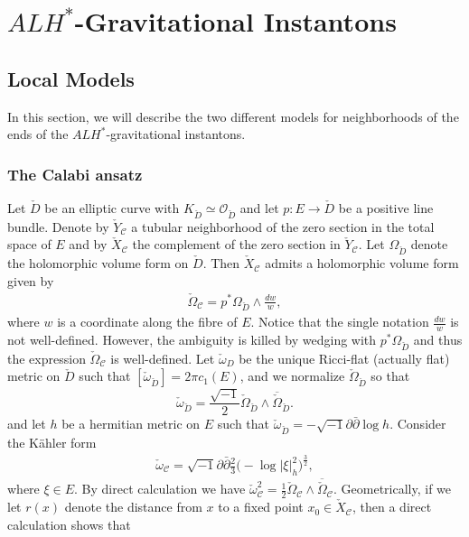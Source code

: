 \documentclass[11pt]{amsart}
\theoremstyle{plain}
\theoremstyle{definition}
\numberwithin{equation}{section}
\begin{document}
\section{$ALH^*$-Gravitational Instantons}   \label{sec: ALH}
\subsection{Local Models} In this section, we will describe the two different models for   neighborhoods of the ends of the $ALH^*$-gravitational instantons. 
 \subsubsection{The Calabi ansatz} \label{sec: Calabi ansatz}
Let $\check{D}$ be an elliptic curve with $K_{\check{D}} \simeq \mathcal{O}_{\check{D}}$ and let $p: E\rightarrow \check{D}$ be a positive line bundle. Denote by $\check{Y}_{\mathcal{C}}$ a tubular neighborhood of the zero section in the total space of $E$ and by $\check{X}_{\mathcal{C}}$ the complement of the zero section in $\check{Y}_{\mathcal{C}}$. Let $\Omega_{\check{D}}$ denote the holomorphic volume form on $\check{D}$. Then $\check{X}_{\mathcal{C}}$ admits a holomorphic volume form given by
\begin{align*}
	\check{\Omega}_{\mathcal{C}}=p^*\Omega_{\check{D}}\wedge \frac{dw}{w},
\end{align*} 
where $w$ is a coordinate along the fibre of $E$. Notice that the single notation $\frac{dw}{w}$ is not well-defined. However, the ambiguity is killed by wedging with $p^*\Omega_{\check{D}}$ and thus the expression $\check{\Omega}_{\mathcal{C}}$ is well-defined. Let $\check{\omega}_D$ be the unique Ricci-flat (actually flat) metric on $\check{D}$ such that $[\check{\omega}_{\check{D}}]=2\pi c_1(E)$, and we normalize $\check{\Omega}_{\check{D}}$ so that
\[
\check{\omega}_{\check{D}} = \frac{\sqrt{-1}}{2}\check{\Omega}_{\check{D}}\wedge \overline{\check{\Omega}}_{\check{D}}.
\]
and let $h$ be a hermitian metric on $E$ such that $\check{\omega}_{\check{D}}=-\sqrt{-1}\partial \bar{\partial}\log h$. Consider the K\"ahler form
\begin{align*}
	\check{\omega}_{\mathcal{C}}=\sqrt{-1}\partial \bar{\partial}\frac{2}{3}\big(-\log{|\xi|^2_h}\big)^{\frac{3}{2}},
\end{align*} 
where $\xi \in E$.  By direct calculation we have
$
\check{\omega}_{\mathcal{C}}^2 = \frac{1}{2} \check{\Omega}_{\mathcal{C}} \wedge \overline{\check{\Omega}}_{\mathcal{C}}.
$
Geometrically, if we let $r(x)$ denote the distance from $x$ to a fixed point $x_0\in \check{X}_{\mathcal{C}}$, then a direct calculation shows that 
\end{document}

